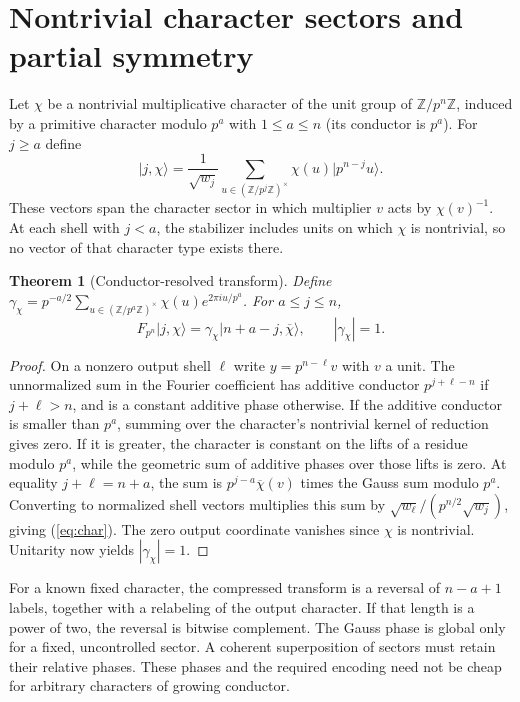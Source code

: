 \documentclass[11pt]{article}
\newtheorem{theorem}{Theorem}
\newcommand{\Z}{\mathbb Z}
\newcommand{\ket}[1]{\lvert #1\rangle}
\begin{document}
\section{Nontrivial character sectors and partial symmetry}
Let $\chi$ be a nontrivial multiplicative character of the unit group of $\Z/p^n\Z$, induced by a primitive character modulo $p^a$ with $1\le a\le n$ (its conductor is $p^a$). For $j\ge a$ define
\begin{equation}
 \ket{j,\chi}=\frac{1}{\sqrt{w_j}}\sum_{u\in(\Z/p^j\Z)^\times}\chi(u)\ket{p^{n-j}u}.
\end{equation}
These vectors span the character sector in which multiplier $v$ acts by $\chi(v)^{-1}$. At each shell with $j<a$, the stabilizer includes units on which $\chi$ is nontrivial, so no vector of that character type exists there.
\begin{theorem}[Conductor-resolved transform]\label{thm:char}
Define $\gamma_\chi=p^{-a/2}\sum_{u\in(\Z/p^a\Z)^\times}\chi(u)e^{2\pi i u/p^a}$. For $a\le j\le n$,
\begin{equation}\label{eq:char}
 F_{p^n}\ket{j,\chi}=\gamma_\chi\ket{n+a-j,\overline{\chi}},\qquad |\gamma_\chi|=1.
\end{equation}
\end{theorem}
\begin{proof}
On a nonzero output shell $\ell$ write $y=p^{n-\ell}v$ with $v$ a unit. The unnormalized sum in the Fourier coefficient has additive conductor $p^{j+\ell-n}$ if $j+\ell>n$, and is a constant additive phase otherwise. If the additive conductor is smaller than $p^a$, summing over the character's nontrivial kernel of reduction gives zero. If it is greater, the character is constant on the lifts of a residue modulo $p^a$, while the geometric sum of additive phases over those lifts is zero. At equality $j+\ell=n+a$, the sum is $p^{j-a}\overline\chi(v)$ times the Gauss sum modulo $p^a$. Converting to normalized shell vectors multiplies this sum by $\sqrt{w_\ell}/(p^{n/2}\sqrt{w_j})$, giving (\ref{eq:char}). The zero output coordinate vanishes since $\chi$ is nontrivial. Unitarity now yields $|\gamma_\chi|=1$.
\end{proof}
For a known fixed character, the compressed transform is a reversal of $n-a+1$ labels, together with a relabeling of the output character. If that length is a power of two, the reversal is bitwise complement. The Gauss phase is global only for a fixed, uncontrolled sector. A coherent superposition of sectors must retain their relative phases. These phases and the required encoding need not be cheap for arbitrary characters of growing conductor.
\end{document}
